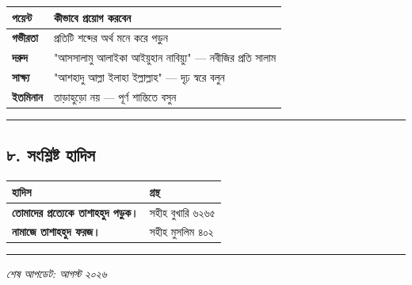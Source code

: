 \begin{table}[h]\centering\small
\begin{tabular}{ll}
পয়েন্ট & কীভাবে প্রয়োগ করবেন \\
\hline
\textbf{গভীরতা} & প্রতিটি শব্দের অর্থ মনে করে পড়ুন \\
\textbf{দরুদ} & "আসসালামু আলাইকা আইয়ুহান নাবিয়্যু" — নবীজির প্রতি সালাম \\
\textbf{সাক্ষ্য} & "আশহাদু আল্লা ইলাহা ইল্লাল্লাহ" — দৃঢ় স্বরে বলুন \\
\textbf{ইতমিনান} & তাড়াহুড়ো নয় — পূর্ণ শান্তিতে বসুন \\
\hline
\end{tabular}
\end{table}

\medskip\hrule\medskip

\subsection*{৮. সংশ্লিষ্ট হাদিস}

\begin{table}[h]\centering\small
\begin{tabular}{ll}
হাদিস & গ্রন্থ \\
\hline
\textbf{\lat{“}তোমাদের প্রত্যেকে তাশাহহুদ পড়ুক।\lat{”}} & সহীহ বুখারি ৬২৬৫ \\
\textbf{\lat{“}নামাজে তাশাহহুদ ফরজ।\lat{”}} & সহীহ মুসলিম ৪০২ \\
\hline
\end{tabular}
\end{table}

\medskip\hrule\medskip

\textit{শেষ আপডেট: আগস্ট ২০২৬}


